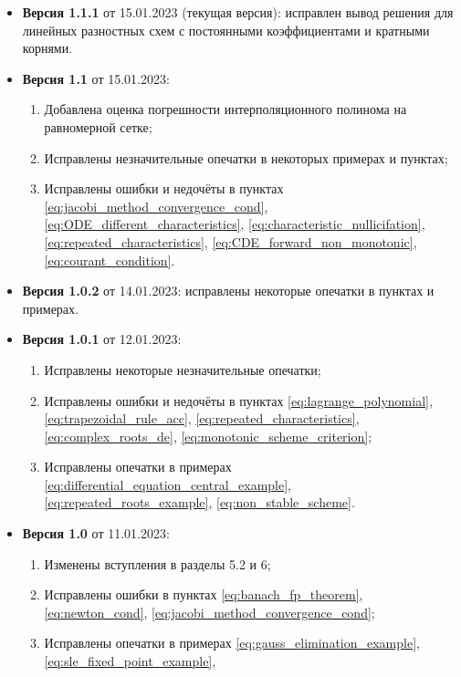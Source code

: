 \documentclass{article}
\begin{document}

\begin{itemize}[nosep]
\item \textbf{Версия 1.1.1} от 15.01.2023 (текущая версия):
	исправлен вывод решения для линейных разностных схем
	с постоянными коэффициентами и кратными корнями.
\item \textbf{Версия 1.1} от 15.01.2023:
	\begin{enumerate}[nosep]
		\item Добавлена оценка погрешности интерполяционного
			полинома на равномерной сетке;
		\item Исправлены незначительные опечатки в некоторых примерах и
			пунктах;
		\item Исправлены ошибки и недочёты в пунктах
			\eqref{eq:jacobi_method_convergence_cond},
			\eqref{eq:ODE_different_characteristics},
			\eqref{eq:characteristic_nullicifation},
			\eqref{eq:repeated_characteristics},
			\eqref{eq:CDE_forward_non_monotonic},
			\eqref{eq:courant_condition}.
	\end{enumerate}
\item \textbf{Версия 1.0.2} от 14.01.2023: исправлены некоторые
	опечатки в пунктах и примерах.
\item \textbf{Версия 1.0.1} от 12.01.2023:
	\begin{enumerate}[nosep]
		\item Исправлены некоторые незначительные опечатки;
		\item Исправлены ошибки и недочёты в пунктах
			\eqref{eq:lagrange_polynomial},
			\eqref{eq:trapezoidal_rule_acc},
			\eqref{eq:repeated_characteristics},
			\eqref{eq:complex_roots_de},
			\eqref{eq:monotonic_scheme_criterion};
		\item Исправлены опечатки в примерах
			\eqref{eq:differential_equation_central_example},
			\eqref{eq:repeated_roots_example},
			\eqref{eq:non_stable_scheme}.
	\end{enumerate}
\item \textbf{Версия 1.0} от 11.01.2023:
	\begin{enumerate}[nosep]
		\item Изменены вступления в разделы 5.2 и 6;
		\item Исправлены ошибки в пунктах
			\eqref{eq:banach_fp_theorem},
			\eqref{eq:newton_cond},
			\eqref{eq:jacobi_method_convergence_cond};
		\item Исправлены опечатки в примерах
			\eqref{eq:gauss_elimination_example},
			\eqref{eq:sle_fixed_point_example},

\end{enumerate}
\end{itemize}
\end{document}

